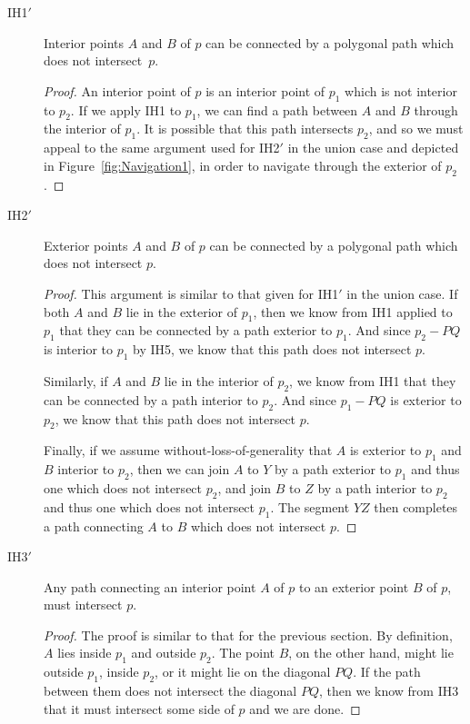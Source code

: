 \begin{description}
\item[IH1$'$] Interior points $A$ and $B$ of $p$ can be connected by a polygonal path which does not intersect~$p$.
  \begin{proof}
    An interior point of $p$ is an interior point of $p_1$ which is not interior to $p_2$. If we apply IH1 to $p_1$, we can find a path between $A$ and $B$ through the interior of $p_1$. It is possible that this path intersects $p_2$, and so we must appeal to the same argument used for IH2$'$ in the union case and depicted in Figure~\ref{fig:Navigation1}, in order to navigate through the exterior of $p_2$.
  \end{proof}
\item[IH2$'$] Exterior points $A$ and $B$ of $p$ can be connected by a polygonal path which does not intersect $p$.
  \begin{proof}
    This argument is similar to that given for IH1$'$ in the union case. If both $A$ and $B$ lie in the exterior of $p_1$, then we know from IH1 applied to $p_1$ that they can be connected by a path exterior to $p_1$. And since $p_2 - PQ$ is interior to $p_1$ by IH5, we know that this path does not intersect $p$.

    Similarly, if $A$ and $B$ lie in the interior of $p_2$, we know from IH1 that they can be connected by a path interior to $p_2$. And since $p_1 - PQ$ is exterior to $p_2$, we know that this path does not intersect $p$.

    Finally, if we assume without-loss-of-generality that $A$ is exterior to $p_1$ and $B$ interior to $p_2$, then we can join $A$ to $Y$ by a path exterior to $p_1$ and thus one which does not intersect $p_2$, and join $B$ to $Z$ by a path interior to $p_2$ and thus one which does not intersect $p_1$. The segment $YZ$ then completes a path connecting $A$ to $B$ which does not intersect $p$.
    \end{proof}

\item[IH3$'$] Any path connecting an interior point $A$ of $p$ to an exterior point $B$ of $p$, must intersect $p$.
  \begin{proof}
    The proof is similar to that for the previous section. By definition, $A$ lies inside $p_1$ and outside $p_2$. The point $B$, on the other hand, might lie outside $p_1$, inside $p_2$, or it might lie on the diagonal $PQ$. If the path between them does not intersect the diagonal $PQ$, then we know from IH3 that it must intersect some side of $p$ and we are done.


\end{proof}
\end{description}

